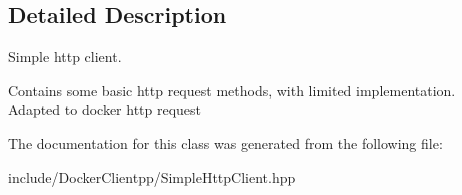 \subsection{Detailed Description}
Simple http client. 

Contains some basic http request methods, with limited implementation. Adapted to docker http request 

The documentation for this class was generated from the following file\+:\begin{DoxyCompactItemize}
\item 
include/\+Docker\+Clientpp/Simple\+Http\+Client.\+hpp\end{DoxyCompactItemize}
